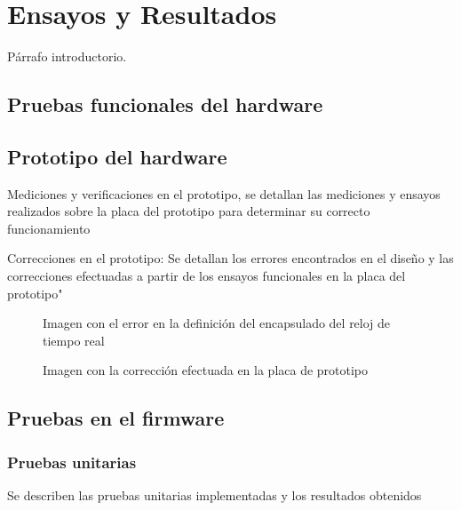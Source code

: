 
\chapter{Ensayos y Resultados} %
\label{Chapter4}

Párrafo introductorio.

\section{Pruebas funcionales del hardware}
\label{sec:pruebasHW}

\section{Prototipo del hardware}
\label{sec:PruebasPrototipo}

Mediciones y verificaciones en el prototipo, se detallan las mediciones y ensayos realizados sobre la placa del prototipo para determinar su correcto funcionamiento

Correcciones en el prototipo: Se detallan los errores encontrados en el diseño y las correcciones efectuadas a partir de los ensayos funcionales en la placa del prototipo"

\begin{figure}[ht]
	\centering
	\caption{Imagen con el error en la definición del encapsulado del reloj de tiempo real}
	\label{fig:ErrorEncapsulado}
\end{figure}

\begin{figure}[ht]
	\centering
	\caption{Imagen con la corrección efectuada en la placa de prototipo}
	\label{fig:ImagenCorreccion}
\end{figure}

\section{Pruebas en el firmware}
\label{sec:PruebasFirmware}

\subsection{Pruebas unitarias}

Se describen las pruebas unitarias implementadas y los resultados obtenidos

